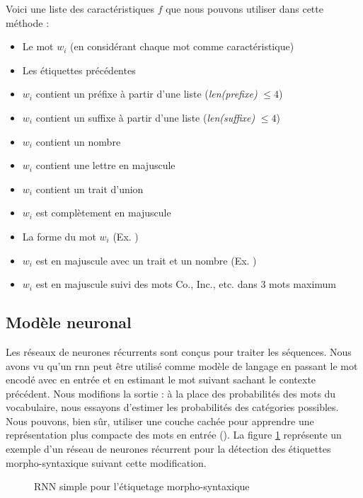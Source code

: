 \documentclass{KodeBook}
\begin{document}
Voici une liste des caractéristiques $f$ que nous pouvons utiliser dans cette méthode :
\begin{itemize}
	\item Le mot $w_i$ (en considérant chaque mot comme caractéristique)
	\item Les étiquettes précédentes 
	\item $w_i$ contient un préfixe à partir d'une liste (\textit{len(prefixe)} $\le 4$) 
	\item $w_i$ contient un suffixe à partir d'une liste (\textit{len(suffixe)} $\le 4$) 
	\item $w_i$ contient un nombre 
	\item $w_i$ contient une lettre en majuscule
	\item $w_i$ contient un trait d'union 
	\item $w_i$ est complètement en majuscule
	\item La forme du mot $w_i$ (Ex. ) 
	\item $w_i$ est en majuscule avec un trait et un nombre (Ex. ) 
	\item $w_i$ est en majuscule suivi des mots Co., Inc., etc. dans 3 mots maximum
\end{itemize}

\subsection{Modèle neuronal}

Les réseaux de neurones récurrents sont conçus pour traiter les séquences.
Nous avons vu qu'un \ac{rnn} peut être utilisé comme modèle de langage en passant le mot encodé avec  en entrée et en estimant le mot suivant sachant le contexte précédent. 
Nous modifions la sortie : à la place des probabilités des mots du vocabulaire, nous essayons d'estimer les probabilités des catégories possibles. 
Nous pouvons, bien sûr, utiliser une couche cachée pour apprendre une représentation plus compacte des mots en entrée (). 
La figure \ref{fig:pos-rnn1} représente un exemple d'un réseau de neurones récurrent pour la détection des étiquettes morpho-syntaxique suivant cette modification.
\begin{figure}[!ht]
	\centering
	\caption[RNN simple pour l'étiquetage morpho-syntaxique]{RNN simple pour l'étiquetage morpho-syntaxique \cite{2019-jurafsky-martin}\label{fig:pos-rnn1}}
\end{figure}
\end{document}
